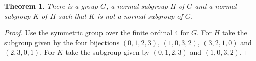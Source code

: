 \documentclass{article}
\newtheorem{theorem}{Theorem}
\begin{document}
\begin{theorem}\label{thm:normalnottrans} There is a group $G$, a normal subgroup $H$ of $G$ and a normal subgroup $K$ of $H$ such that $K$ is not a normal subgroup of $G$.
\end{theorem}
\begin{proof} Use the symmetric group over the finite ordinal $4$ for $G$.
  For $H$ take the subgroup given by the four bijections $(0,1,2,3)$, $(1,0,3,2)$, $(3,2,1,0)$ and $(2,3,0,1)$.
  For $K$ take the subgroup given by $(0,1,2,3)$ and $(1,0,3,2)$.
\end{proof}




\end{document}
